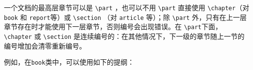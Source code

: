 一个文档的最高层章节可以是 \verb|\part| ，也可以不用 \verb|\part| 直接使用 \verb|\chapter|（对 \verb|book| 和 \verb|report|等）或 \verb|\section| （对 \verb|article| 等）；除 \verb|\part| 外，只有在上一层章节存在时才能使用下一层章节，否则编号会出现错误。在 \verb|\part|下面， \verb|\chapter| 或 \verb|\section|
是连续编号的：在其他情况下，下一级的章节随上一节的编号增加会清零重新编号。

例如，在\verb|book|类中，可以使用如下的提纲：

